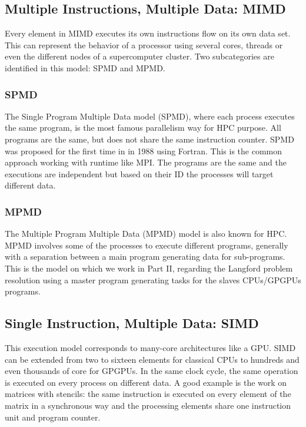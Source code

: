 \subsection{Multiple Instructions, Multiple Data: MIMD}
Every element in MIMD executes its own instructions flow on its own data set. 
This can represent the behavior of a processor using several cores, threads or even the different nodes of a supercomputer cluster. 
Two subcategories are identified in this model: SPMD and MPMD.

\subsubsection{SPMD}
The Single Program Multiple Data model (SPMD), where each process executes the same program, is the most famous parallelism way for HPC purpose.
All programs are the same, but does not share the same instruction counter. 
SPMD was proposed for the first time in \cite{darema1988single} in 1988 using Fortran.
This is the common approach working with runtime like MPI. 
The programs are the same and the executions are independent but based on their ID the processes will target different data. 

\subsubsection{MPMD}
The Multiple Program Multiple Data (MPMD) model is also known for HPC.
MPMD involves some of the processes to execute different programs, generally with a separation between a main program generating data for sub-programs. 
This is the model on which we work in Part II, regarding the Langford problem resolution using a master program generating tasks for the slaves CPUs/GPGPUs programs.

\subsection{Single Instruction, Multiple Data: SIMD}
This execution model corresponds to many-core architectures like a GPU. 
SIMD can be extended from two to sixteen elements for classical CPUs to hundreds and even thousands of core for GPGPUs. 
In the same clock cycle, the same operation is executed on every process on different data. 
A good example is the work on matrices with stencils: the same instruction is executed on every element of the matrix in a synchronous way and the processing elements share one instruction unit and program counter. 

